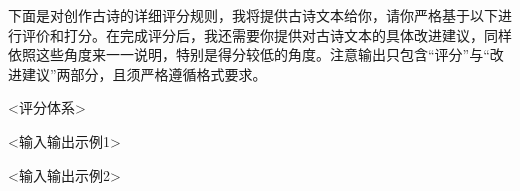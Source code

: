 \begin{tcolorbox}[
  colback=white, %
  colframe=black, 
  boxrule=1pt,        %
  arc=0mm             %
  ]
  \kaishu 下面是对创作古诗的详细评分规则，我将提供古诗文本给你，请你严格基于以下进行评价和打分。在完成评分后，我还需要你提供对古诗文本的具体改进建议，同样依照这些角度来一一说明，特别是得分较低的角度。注意输出只包含“评分”与“改进建议”两部分，且须严格遵循格式要求。

  <评分体系>

  <输入输出示例1>


  <输入输出示例2>
\end{tcolorbox}

